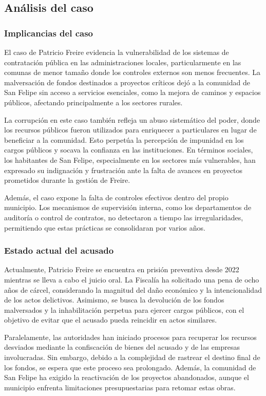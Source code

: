 \documentclass[letter,12pt]{article}
\begin{document}
	\subsection{Análisis del caso}
	\subsubsection{Implicancias del caso}
	El caso de Patricio Freire evidencia la vulnerabilidad de los sistemas de contratación pública en las administraciones locales, particularmente en las comunas de menor tamaño donde los controles externos son menos frecuentes. La malversación de fondos destinados a proyectos críticos dejó a la comunidad de San Felipe sin acceso a servicios esenciales, como la mejora de caminos y espacios públicos, afectando principalmente a los sectores rurales.
	
	La corrupción en este caso también refleja un abuso sistemático del poder, donde los recursos públicos fueron utilizados para enriquecer a particulares en lugar de beneficiar a la comunidad. Esto perpetúa la percepción de impunidad en los cargos públicos y socava la confianza en las instituciones. En términos sociales, los habitantes de San Felipe, especialmente en los sectores más vulnerables, han expresado su indignación y frustración ante la falta de avances en proyectos prometidos durante la gestión de Freire.
	
	Además, el caso expone la falta de controles efectivos dentro del propio municipio. Los mecanismos de supervisión interna, como los departamentos de auditoría o control de contratos, no detectaron a tiempo las irregularidades, permitiendo que estas prácticas se consolidaran por varios años.
	
	\subsubsection{Estado actual del acusado}
	Actualmente, Patricio Freire se encuentra en prisión preventiva desde 2022 mientras se lleva a cabo el juicio oral. La Fiscalía ha solicitado una pena de ocho años de cárcel, considerando la magnitud del daño económico y la intencionalidad de los actos delictivos. Asimismo, se busca la devolución de los fondos malversados y la inhabilitación perpetua para ejercer cargos públicos, con el objetivo de evitar que el acusado pueda reincidir en actos similares.
	
	Paralelamente, las autoridades han iniciado procesos para recuperar los recursos desviados mediante la confiscación de bienes del acusado y de las empresas involucradas. Sin embargo, debido a la complejidad de rastrear el destino final de los fondos, se espera que este proceso sea prolongado. Además, la comunidad de San Felipe ha exigido la reactivación de los proyectos abandonados, aunque el municipio enfrenta limitaciones presupuestarias para retomar estas obras.
	
\end{document}
